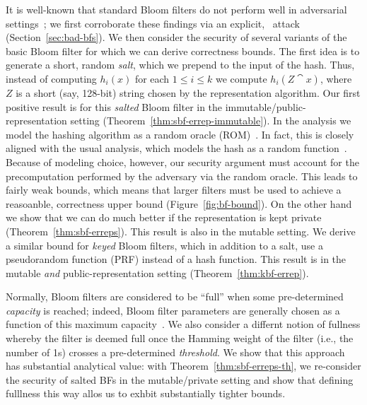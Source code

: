 %
It is well-known that standard Bloom filters do not perform well in adversarial
settings~\cite{naor2015bloom,gerbet2015power}; we first corroborate these
findings via an explicit, \erreps\ attack (Section~\ref{sec:bad-bfs}).
%
We then consider the security of several variants of the basic Bloom
filter for which we can derive correctness bounds.
%
The first idea is to generate a short, random \emph{salt}, which we prepend to
the input of the hash. Thus, instead of computing $h_i(x)$ for each $1\leq i
\leq k$ we compute $h_i(Z \cat x)$, where~$Z$ is a short (say, 128-bit) string
chosen by the representation algorithm.
%
Our first positive result is for this \emph{salted} Bloom filter in the
immutable/public-representation setting (Theorem~\ref{thm:sbf-errep-immutable}).
%
In the analysis we model the hashing algorithm as a random oracle
(ROM)~\cite{BR93}. In fact, this is closely aligned with the usual analysis,
which models the hash as a random function~\cite{broder2004network}. Because of
modeling choice, however, our security argument must account for the
precomputation performed by the adversary via the random oracle. This leads to
fairly weak bounds, which means that larger filters must be used to achieve a
reasoanble, correctness upper bound (Figure~\ref{fig:bf-bound}). On the other
hand we show that we can do much better if the representation is kept private
(Theorem~\ref{thm:sbf-erreps}). This result is also in the mutable setting.
%
We derive a similar bound for \emph{keyed} Bloom filters, which in addition to a
salt, use a pseudorandom function (PRF) instead of a hash function. This result is
in the mutable \emph{and} public-representation setting
(Theorem~\ref{thm:kbf-errep}).

Normally, Bloom filters are considered to be ``full'' when some pre-determined
\emph{capacity} is reached; indeed, Bloom filter parameters are generally chosen
as a function of this maximum capacity~\cite{kirsch2006less}.
%
We also consider a differnt notion of fullness whereby the filter is deemed full
once the Hamming weight of the filter (i.e., the number of 1s) crosses a
pre-determined \emph{threshold}. We show that this approach has substantial
analytical value: with Theorem~\ref{thm:sbf-erreps-th}, we re-consider the
security of salted BFs in the mutable/private setting and show that defining
fulllness this way allos us to exhbit substantially tighter bounds.



